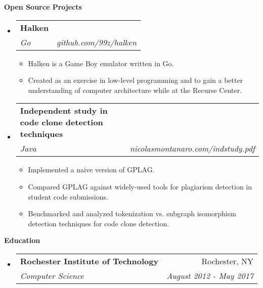 \documentclass[letterpaper,11pt]{article}
\makeatletter
\newcommand{\resitem}[1]{\item #1 \vspace{-2pt}}
\newcommand{\resheading}[1]{{\large \colorbox{mygrey}{\begin{minipage}{\textwidth}{\textbf{#1 \vphantom{p\^{E}}}}\end{minipage}}}}
\newcommand{\ressubheading}[4]{
\begin{tabular*}{7.0in}{l@{\extracolsep{\fill}}r}
		\textbf{#1} & #2 \\
		\textit{#3} & \textit{#4} \\
\end{tabular*}\vspace{-6pt}}
\makeatother
\begin{document}
\resheading{Open Source Projects}

\begin{itemize}
\item 
	\ressubheading{Halken}{}{Go}{github.com/99z/halken}
	\begin{itemize}
		\resitem{Halken is a Game Boy emulator written in Go.}
		\resitem{Created as an exercise in low-level programming and to gain a better understanding of computer architecture while at the Recurse Center.}
	\end{itemize}
\item 
	\ressubheading{Independent study in code clone detection techniques}{}{Java}{nicolasmontanaro.com/indstudy.pdf}
	\begin{itemize}
		\resitem{Implemented a naive version of GPLAG.}
		\resitem{Compared GPLAG against widely-used tools for plagiarism detection in student code submissions.}
		\resitem{Benchmarked and analyzed tokenization vs. subgraph isomorphism detection techniques for code clone detection.}
	\end{itemize}
\end{itemize}

\resheading{Education}
\begin{itemize}
	\item \ressubheading{Rochester Institute of Technology}{Rochester, NY}{Computer Science}{August 2012 - May 2017}
\end{itemize}


\end{document}
